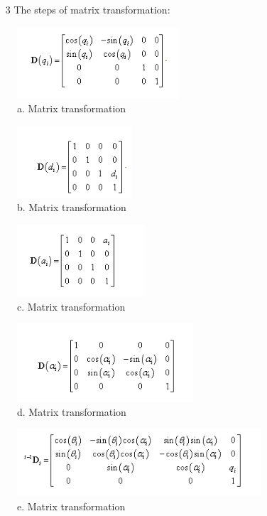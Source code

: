 		\begin{enumerate}
			\item [3] The steps of matrix transformation: \\
		\end{enumerate} 

		\begin{figure}[H]
			\centering
			\includegraphics[]{./images/denavit1}
			\caption{a. Matrix transformation}
		\end{figure}
		\begin{figure}[H]
			\centering
			\includegraphics[]{./images/denavit2}
			\caption{b. Matrix transformation}
		\end{figure}
		\begin{figure}[H]
			\centering
			\includegraphics[]{./images/denavit3}
			\caption{c. Matrix transformation}
		\end{figure}
		\begin{figure}[H]
			\centering
			\includegraphics[]{./images/denavit4}
			\caption{d. Matrix transformation}
		\end{figure}
		\begin{figure}[H]
			\centering
			\includegraphics[]{./images/denavit5}
			\caption{e. Matrix transformation}
		\end{figure}
		
